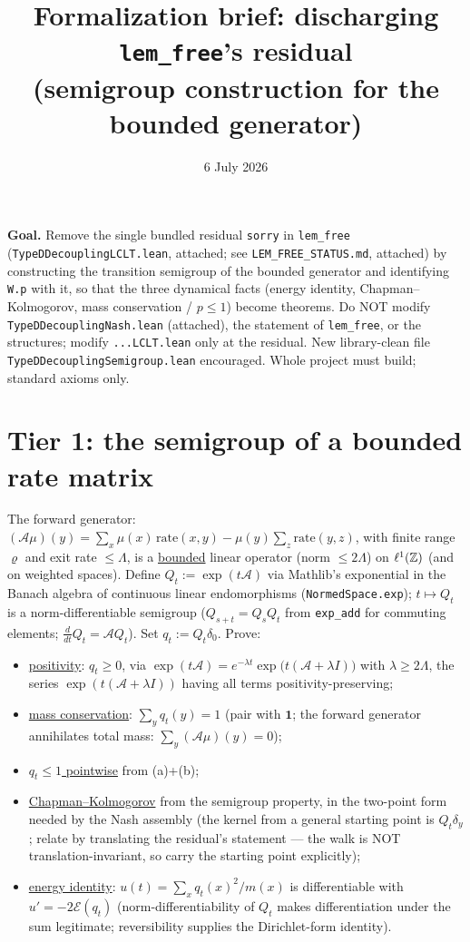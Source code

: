 \documentclass[11pt]{article}
\title{Formalization brief: discharging \texttt{lem\_free}'s residual\\
(semigroup construction for the bounded generator)}
\date{6 July 2026}
\theoremstyle{plain}
\theoremstyle{remark}
\begin{document}
\maketitle

\noindent\textbf{Goal.} Remove the single bundled residual \texttt{sorry} in
\texttt{lem\_free} (\texttt{TypeDDecouplingLCLT.lean}, attached; see
\texttt{LEM\_FREE\_STATUS.md}, attached) by constructing the transition
semigroup of the bounded generator and identifying \texttt{W.p} with it, so
that the three dynamical facts (energy identity, Chapman--Kolmogorov,
mass conservation / $p\le1$) become theorems. Do NOT modify
\texttt{TypeDDecouplingNash.lean} (attached), the statement of
\texttt{lem\_free}, or the structures; modify \texttt{...LCLT.lean} only at
the residual. New library-clean file \texttt{TypeDDecouplingSemigroup.lean}
encouraged. Whole project must build; standard axioms only.

\section*{Tier 1: the semigroup of a bounded rate matrix}

The forward generator: $(\mathcal A\mu)(y)=\sum_x\mu(x)\,\mathrm{rate}(x,y)
-\mu(y)\sum_z\mathrm{rate}(y,z)$, with finite range $\varrho$ and exit rate
$\le\Lambda$, is a \underline{bounded} linear operator (norm $\le2\Lambda$) on
$\ell^1(\mathbb{Z})$ (and on weighted spaces). Define $Q_t:=\exp(t\mathcal A)$ via
Mathlib's exponential in the Banach algebra of continuous linear endomorphisms
(\texttt{NormedSpace.exp}); $t\mapsto Q_t$ is a norm-differentiable semigroup
($Q_{s+t}=Q_sQ_t$ from \texttt{exp\_add} for commuting elements;
$\frac{d}{dt}Q_t=\mathcal AQ_t$). Set $q_t:=Q_t\delta_0$. Prove:
\begin{itemize}
\item[(a)] \underline{positivity}: $q_t\ge0$, via
$\exp(t\mathcal A)=e^{-\lambda t}\exp\big(t(\mathcal A+\lambda I)\big)$ with
$\lambda\ge2\Lambda$, the series $\exp(t(\mathcal A+\lambda I))$ having all
terms positivity-preserving;
\item[(b)] \underline{mass conservation}: $\sum_yq_t(y)=1$ (pair with
$\mathbf 1$; the forward generator annihilates total mass:
$\sum_y(\mathcal A\mu)(y)=0$);
\item[(c)] \underline{$q_t\le1$ pointwise} from (a)+(b);
\item[(d)] \underline{Chapman--Kolmogorov} from the semigroup property, in the
two-point form needed by the Nash assembly (the kernel from a general starting
point is $Q_t\delta_y$; relate by translating the residual's statement --- the
walk is NOT translation-invariant, so carry the starting point explicitly);
\item[(e)] \underline{energy identity}: $u(t)=\sum_x q_t(x)^2/m(x)$ is
differentiable with $u'=-2\mathcal E(q_t)$ (norm-differentiability of $Q_t$
makes differentiation under the sum legitimate; reversibility supplies the
Dirichlet-form identity).
\end{itemize}
\end{document}
